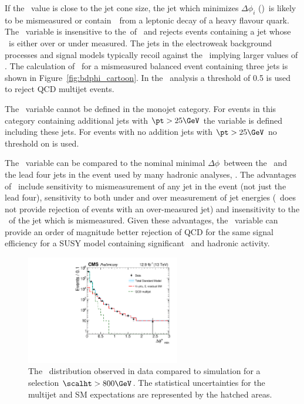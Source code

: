 If the \bdphi~value is close to the jet cone size, the jet which minimizes $\Delta \phi_i$ (\jbdphi)~is likely 
to be mismeasured or contain~\met~from a leptonic decay of a heavy flavour quark. The \bdphi~variable is insensitive to
the~\pt of \jbdphi~and rejects events containing a jet whose \pt~is either over or under measured.
The jets in the electroweak background processes and signal models typically recoil against the
\met~implying larger values of \bdphi. The calculation of \bdphi~for a mismeasured balanced 
event containing three jets is shown in Figure~\ref{fig:bdphi_cartoon}. 
In the \alphat~analysis a threshold of 0.5 is used to reject QCD multijet events.

The \bdphi~variable cannot be defined in the monojet category. For events in this category
containing additional jets with $\pt > 25 \GeV$ the \bdphi variable is defined 
including these jets. For events with no addition jets with $\pt > 25 \GeV$
no threshold on \bdphi is used.

The \bdphi~variable can be compared to the nominal minimal $\Delta \phi$~between
the \mht~and the lead four jets in the event used by many hadronic analyses, \dphimhtj.
The advantages of \bdphi~include sensitivity to mismeasurement of any jet in the 
event (not just the lead four), sensitivity to both under and over measurement
of jet energies (\dphimhtj~does not provide rejection of events with an over-measured jet)
and insensitivity to the \pt~of the jet which is mismeasured. Given these advantages, 
the \bdphi~variable can provide an order of magnitude better rejection of QCD for the 
same signal efficiency for a SUSY model containing significant \met~and hadronic activity.

\begin{figure}[!htb]
  \centering
    \includegraphics[width=0.6\textwidth]{./Figures/alphat/bdphi_data.pdf}
  \caption{
    The \bdphi~distribution observed in data compared to simulation for a selection $\scalht > 800\GeV$.
    The statistical uncertainties for the multijet and SM expectations are represented by the hatched areas. 
    }
  \label{fig:bdphi-data}
\end{figure}


